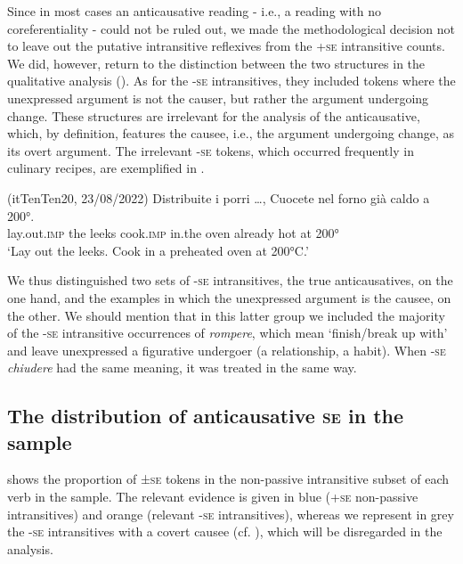 \documentclass[output=paper,colorlinks,citecolor=brown
]{langscibook}
\begin{document}
Since in most cases an anticausative reading - i.e., a reading with no coreferentiality - could not be ruled out, we made the methodological decision not to leave out the putative intransitive reflexives from the +\textsc{se} intransitive counts. We did, however, return to the distinction between the two structures in the qualitative analysis ().
As for the -\textsc{se} intransitives, they included tokens where the unexpressed argument is not the causer, but rather the argument undergoing change. These structures are irrelevant for the analysis of the anticausative, which, by definition, features the causee, i.e., the argument undergoing change, as its overt argument. The irrelevant -\textsc{se} tokens, which occurred frequently in culinary recipes, are exemplified in .

\ea (itTenTen20, 23/08/2022)\label{bentley_example_6}
\gll Distribuite i porri  \ldots , Cuocete nel forno già caldo a 200°. \\
    lay.out.\textsc{imp}	the	leeks {} cook.\textsc{imp} in.the oven already hot at 200° \\
\glt ‘Lay out the leeks. Cook in a preheated oven at 200°C.’ 
\z

We thus distinguished two sets of -\textsc{se} intransitives, the true anticausatives, on the one hand, and the examples in which the unexpressed argument is the causee, on the other. We should mention that in this latter group we included the majority of the -\textsc{se} intransitive occurrences of \textit{rompere}, which mean ‘finish/break up with’ and leave unexpressed a figurative undergoer (a relationship, a habit). When -\textsc{se} \textit{chiudere} had the same meaning, it was treated in the same way. 

\subsection{The distribution of anticausative \textsc{se} in the sample}
\label{bentley_section_3.2}
 shows the proportion of ±\textsc{se} tokens in the non-passive intransitive subset of each verb in the sample. The relevant evidence is given in blue (+\textsc{se} non-passive intransitives) and orange (relevant -\textsc{se} intransitives), whereas we represent in grey the -\textsc{se} intransitives with a covert causee (cf. ), which will be disregarded in the analysis.
\end{document}
